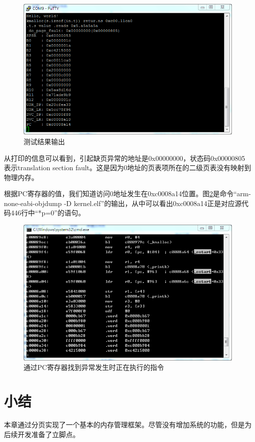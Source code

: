 \documentclass[main.tex]{subfiles}
\begin{document}
\begin{CJK*}{UTF8}{song}
\begin{figure}[htp]
\centering
\includegraphics[scale=0.5]{figures/4-10}
\caption{测试结果输出}
\label{figure:4-10}
\end{figure}

从打印的信息可以看到，引起缺页异常的地址是0x00000000，状态码0x00000805表示translation section fault。这是因为0地址的页表项所在的二级页表没有映射到物理内存。

\par
根据PC寄存器的值，我们知道访问0地址发生在0xc0008a14位置。图\ref{figure:4-11}是命令“arm-none-eabi-objdump -D kernel.elf”的输出，从中可以看出0xc0008a14正是对应源代码446行中“*p=0”的语句。

\begin{figure}[htp]
\centering
\includegraphics[scale=0.5]{figures/4-11}
\caption{通过PC寄存器找到异常发生时正在执行的指令}
\label{figure:4-11}
\end{figure}

\section{小结}
本章通过分页实现了一个基本的内存管理框架。尽管没有增加系统的功能，但是为后续开发准备了立脚点。

\clearpage
\ifxetex\else\end{CJK*}\fi
\end{document}
